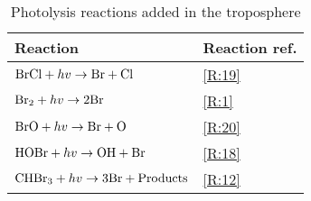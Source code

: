 \begin{table}[]
\centering
\begin{tabular}{|l|l|}
\hline
\textbf{Reaction}                                             & \textbf{Reaction ref.} \\ \hline
$\mathrm{BrCl} + hv \rightarrow \mathrm{Br} + \mathrm{Cl}$          & \ref{R:19}             \\
$\mathrm{Br_2} + hv \rightarrow 2\mathrm{Br}$                     & \ref{R:1}              \\
$\mathrm{BrO} + hv \rightarrow \mathrm{Br} + \mathrm{O}$                & \ref{R:20}             \\
$\mathrm{HOBr} + hv \rightarrow \mathrm{OH} + \mathrm{Br}$          & \ref{R:18}             \\
$\mathrm{CHBr_3} + hv \rightarrow 3\mathrm{Br} + \text{Products}$ & \ref{R:12}             \\ \hline
\end{tabular}
\caption{Photolysis reactions added in the troposphere}
\label{tab:photolysis_reactions}
\end{table}